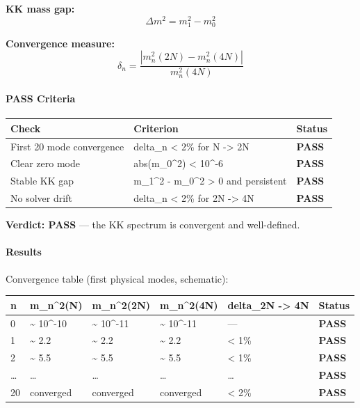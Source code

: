 \documentclass[
  11pt,
]{article}
\begin{document}
\textbf{KK mass gap:} \[\Delta m^2 = m_1^2 - m_0^2 \tag{119}\]

\textbf{Convergence measure:}
\[\delta_n = \frac{|m_n^2(2N) - m_n^2(4N)|}{m_n^2(4N)} \tag{120}\]

\bigskip

\hypertarget{pass-criteria-3}{%
\paragraph{PASS Criteria}\label{pass-criteria-3}}

\begin{longtable}[]{@{}lll@{}}
\toprule
Check & Criterion & Status\tabularnewline
\midrule
\endhead
First 20 mode convergence & delta\_n \textless{} 2\% for N
-\textgreater{} 2N & \textbf{PASS}\tabularnewline
Clear zero mode & abs(m\_0\^{}2) \textless{} 10\^{}-6 &
\textbf{PASS}\tabularnewline
Stable KK gap & m\_1\^{}2 - m\_0\^{}2 \textgreater{} 0 and persistent &
\textbf{PASS}\tabularnewline
No solver drift & delta\_n \textless{} 2\% for 2N -\textgreater{} 4N &
\textbf{PASS}\tabularnewline
\bottomrule
\end{longtable}

\textbf{Verdict: PASS} --- the KK spectrum is convergent and
well-defined.

\bigskip

\hypertarget{results-3}{%
\paragraph{Results}\label{results-3}}

Convergence table (first physical modes, schematic):

\begin{longtable}[]{@{}llllll@{}}
\toprule
n & m\_n\^{}2(N) & m\_n\^{}2(2N) & m\_n\^{}2(4N) & delta\_2N
-\textgreater{} 4N & Status\tabularnewline
\midrule
\endhead
0 & \textasciitilde{} 10\^{}-10 & \textasciitilde{} 10\^{}-11 &
\textasciitilde{} 10\^{}-11 & --- & \textbf{PASS}\tabularnewline
1 & \textasciitilde{} 2.2 & \textasciitilde{} 2.2 & \textasciitilde{}
2.2 & \textless{} 1\% & \textbf{PASS}\tabularnewline
2 & \textasciitilde{} 5.5 & \textasciitilde{} 5.5 & \textasciitilde{}
5.5 & \textless{} 1\% & \textbf{PASS}\tabularnewline
\ldots{} & \ldots{} & \ldots{} & \ldots{} & \ldots{} &
\textbf{PASS}\tabularnewline
20 & converged & converged & converged & \textless{} 2\% &
\textbf{PASS}\tabularnewline
\bottomrule
\end{longtable}
\end{document}
